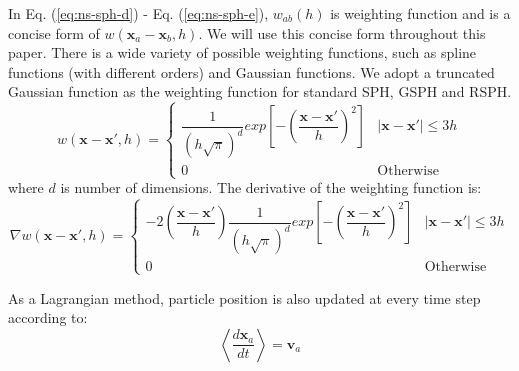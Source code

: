 In Eq. (\ref{eq:ns-sph-d}) - Eq. (\ref{eq:ns-sph-e}), $w_{a b}\left(h\right)$ is weighting function and is a concise form of $w\left(\textbf{x}_a - \textbf{x}_b, h\right)$. We will use this concise form throughout this paper.
There is a wide variety of possible weighting functions, such as spline functions (with different orders) and Gaussian functions. We adopt a truncated Gaussian function as the weighting function for standard SPH, GSPH and RSPH.
\begin{equation}
w\left(\textbf{x} - \textbf{x} \prime, h \right) = 
\begin{cases} 
      \dfrac{1}{\left(h \sqrt{\pi}\right)^d} exp \left[- \left(\dfrac{\textbf{x} - \textbf{x} \prime}{h} \right)^2 \right] &  \vert \textbf{x} - \textbf{x} \prime \vert \leq 3h\\
      0 & \text{Otherwise}
\end{cases}
\label{eq:SPH-kernel}
\end{equation}
where $d$ is number of dimensions.
The derivative of the weighting function is:
\begin{equation}
\nabla w\left(\textbf{x} - \textbf{x} \prime, h \right) = 
\begin{cases} 
      -2\left(\dfrac{\textbf{x} - \textbf{x} \prime}{h}\right) \dfrac{1}{\left(h \sqrt{\pi}\right)^d} exp \left[- \left(\dfrac{\textbf{x} - \textbf{x} \prime}{h}\right)^2 \right] &  \vert \textbf{x} - \textbf{x} \prime \vert \leq 3h\\
      0 & \text{Otherwise}
\end{cases}
\label{eq:SPH-kernel-gradient}
\end{equation}

As a Lagrangian method, particle position is also updated at every time step according to:
\begin{equation}
\left\langle\dfrac{d \textbf{x}_a}{dt}\right\rangle = \textbf{v}_a \label{eq:SPH-update-pos}
\end{equation}

